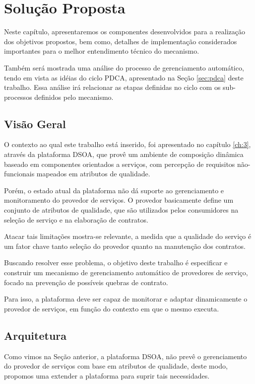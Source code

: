 \chapter{Solução Proposta}
\label{ch:4}

Neste capítulo, apresentaremos os componentes desenvolvidos para a realização dos objetivos propostos, bem como, detalhes de implementação considerados importantes para o melhor entendimento técnico do mecanismo. 

Também será mostrada uma análise do processo de gerenciamento automático, tendo em vista as idéias do ciclo PDCA, apresentado na Seção \ref{sec:pdca} deste trabalho. Essa análise irá relacionar as etapas definidas no ciclo com os sub-processos definidos pelo mecanismo.

\section{Visão Geral}
O contexto ao qual este trabalho está inserido, foi apresentado no capítulo \ref{ch:3}, através da plataforma DSOA, que provê um ambiente de composição dinâmica baseado em componentes orientados a serviços, com percepção de requisitos não-funcionais mapeados em atributos de qualidade. 

Porém, o estado atual da plataforma não dá suporte ao gerenciamento e monitoramento do provedor de serviços. O provedor basicamente define um conjunto de atributos de qualidade, que são utilizados pelos consumidores na seleção de serviço e na elaboração de contratos.

Atacar tais limitações mostra-se relevante, a medida que a qualidade do serviço é um fator chave tanto seleção do provedor quanto na manutenção dos contratos.

Buscando resolver esse problema, o objetivo deste trabalho é especificar e construir um mecanismo de gerenciamento automático de provedores de serviço, focado na prevenção de possíveis quebras de contrato. 

Para isso, a plataforma deve ser capaz de monitorar e adaptar dinamicamente o provedor de serviços, em função do contexto em que o mesmo executa.


\section{Arquitetura}
\label{sec:arch_prop}

Como vimos na Seção anterior, a plataforma DSOA, não prevê o gerenciamento do provedor de serviços com base em atributos de qualidade, deste modo, propomos uma extender a plataforma para suprir tais necessidades.

